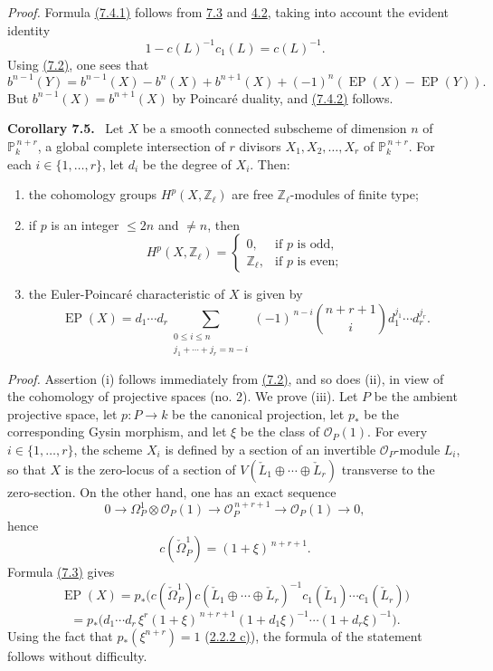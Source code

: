 \documentclass[11pt]{article}
\newenvironment{statement}[1]{\par\medskip\noindent\textbf{#1.}\ }{\par\medskip}
\begin{document}
\emph{Proof.} Formula \hyperref[sga5:VII:equation:7.4.1]{(7.4.1)} follows from \hyperref[sga5:VII:proposition:7.3]{7.3} and \hyperref[sga5:VII:lemma:4.2]{4.2}, taking into account the evident identity
\[
1-c(L)^{-1}c_1(L)=c(L)^{-1}.
\]
Using \hyperref[sga5:VII:corollary:7.2]{(7.2)}, one sees that
\[
b^{n-1}(Y)=b^{n-1}(X)-b^n(X)+b^{n+1}(X)+(-1)^n(\operatorname{EP}(X)-\operatorname{EP}(Y)).
\]
But $b^{n-1}(X)=b^{n+1}(X)$ by Poincaré duality, and \hyperref[sga5:VII:equation:7.4.2]{(7.4.2)} follows.

\label{sga5:VII:corollary:7.5}\begin{statement}{Corollary 7.5}
Let $X$ be a smooth connected subscheme of dimension $n$ of $\mathbb P_k^{\,n+r}$, a global complete intersection of $r$ divisors $X_1,X_2,\ldots,X_r$ of $\mathbb P_k^{\,n+r}$. For each $i\in\{1,\ldots,r\}$, let $d_i$ be the degree of $X_i$. Then:
\begin{enumerate}[label=(\roman*)]
\item the cohomology groups $H^p(X,\mathbb Z_\ell)$ are free $\mathbb Z_\ell$-modules of finite type;
\item if $p$ is an integer $\le 2n$ and $\ne n$, then
\[
H^p(X,\mathbb Z_\ell)=
\begin{cases}
0,&\text{if }p\text{ is odd},\\
\mathbb Z_\ell,&\text{if }p\text{ is even};
\end{cases}
\]
\item the Euler-Poincaré characteristic of $X$ is given by
\[
\operatorname{EP}(X)
=d_1\cdots d_r
\sum_{\substack{0\le i\le n\\ j_1+\cdots+j_r=n-i}}
(-1)^{\,n-i}\binom{n+r+1}{i}
d_1^{j_1}\cdots d_r^{j_r}.
\]
\end{enumerate}
\end{statement}

\emph{Proof.} Assertion (i) follows immediately from \hyperref[sga5:VII:corollary:7.2]{(7.2)}, and so does (ii), in view of the cohomology of projective spaces (no. 2). We prove (iii). Let $P$ be the ambient projective space, let $p:P\to k$ be the canonical projection, let $p_*$ be the corresponding Gysin morphism, and let $\xi$ be the class of $\mathcal O_P(1)$. For every $i\in\{1,\ldots,r\}$, the scheme $X_i$ is defined by a section of an invertible $\mathcal O_P$-module $L_i$, so that $X$ is the zero-locus of a section of $V(\check L_1\oplus\cdots\oplus\check L_r)$ transverse to the zero-section. On the other hand, one has an exact sequence
\[
0\to\Omega_P^1\otimes\mathcal O_P(1)\to\mathcal O_P^{\,n+r+1}\to\mathcal O_P(1)\to0,
\]
hence
\[
c(\check\Omega_P^1)=(1+\xi)^{\,n+r+1}.
\]
Formula \hyperref[sga5:VII:proposition:7.3]{(7.3)} gives
\[
\operatorname{EP}(X)
=p_*\bigl(c(\check\Omega_P^1)c(\check L_1\oplus\cdots\oplus\check L_r)^{-1}
c_1(\check L_1)\cdots c_1(\check L_r)\bigr)
\]
\[
=p_*\bigl(d_1\cdots d_r\,\xi^r(1+\xi)^{\,n+r+1}
(1+d_1\xi)^{-1}\cdots(1+d_r\xi)^{-1}\bigr).
\]
Using the fact that $p_*(\xi^{n+r})=1$ (\hyperref[sga5:VII:proposition:2.2.2]{2.2.2 c)}), the formula of the statement follows without difficulty.
\end{document}
